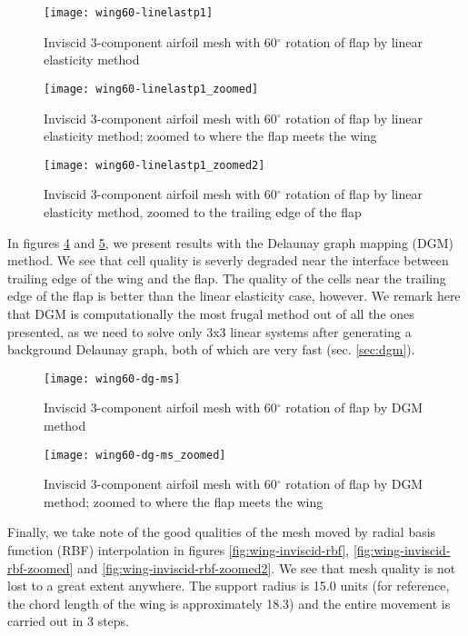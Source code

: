 \begin{figure}
	\centering
	\texttt{[image: wing60-linelastp1]}
	\caption{Inviscid 3-component airfoil mesh with 60$^\circ$ rotation of flap by linear elasticity method}
	\label{fig:wing-inviscid-linelastp1}
\end{figure}
\begin{figure}
	\centering
	\texttt{[image: wing60-linelastp1\_zoomed]}
	\caption{Inviscid 3-component airfoil mesh with 60$^\circ$ rotation of flap by linear elasticity method; zoomed to where the flap meets the wing}
	\label{fig:wing-inviscid-linelastp1-zoomed}
\end{figure}
\begin{figure}
	\centering
	\texttt{[image: wing60-linelastp1\_zoomed2]}
	\caption{Inviscid 3-component airfoil mesh with 60$^\circ$ rotation of flap by linear elasticity method, zoomed to the trailing edge of the flap}
	\label{fig:wing-inviscid-linelastp1-zoomed2}
\end{figure}

In figures \ref{fig:wing-inviscid-dg-ms} and \ref{fig:wing-inviscid-dg-ms-zoomed}, we present results with the Delaunay graph mapping (DGM) method. We see that cell quality is severly degraded near the interface between trailing edge of the wing and the flap. The quality of the cells near the trailing edge of the flap is better than the linear elasticity case, however. We remark here that DGM is computationally the most frugal method out of all the ones presented, as we need to solve only 3x3 linear systems after generating a background Delaunay graph, both of which are very fast (sec. \ref{sec:dgm}).

\begin{figure}
	\centering
	\texttt{[image: wing60-dg-ms]}
	\caption{Inviscid 3-component airfoil mesh with 60$^\circ$ rotation of flap by DGM method}
	\label{fig:wing-inviscid-dg-ms}
\end{figure}
\begin{figure}
	\centering
	\texttt{[image: wing60-dg-ms\_zoomed]}
	\caption{Inviscid 3-component airfoil mesh with 60$^\circ$ rotation of flap by DGM method; zoomed to where the flap meets the wing}
	\label{fig:wing-inviscid-dg-ms-zoomed}
\end{figure}

Finally, we take note of the good qualities of the mesh moved by radial basis function (RBF) interpolation in figures \ref{fig:wing-inviscid-rbf}, \ref{fig:wing-inviscid-rbf-zoomed} and \ref{fig:wing-inviscid-rbf-zoomed2}. We see that mesh quality is not lost to a  great extent anywhere. The support radius is 15.0 units (for reference, the chord length of the wing is approximately 18.3) and the entire movement is carried out in 3 steps.

